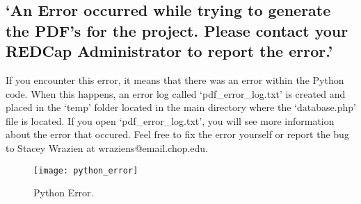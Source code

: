 \documentclass[12pt]{article}
\begin{document}
\subsection{`An Error occurred while trying to generate the PDF's for the project. Please contact your REDCap Administrator to report the error.'}
If you encounter this error, it means that there was an error within the Python code. When this happens, an error log called `pdf\_error\_log.txt' is created and placed in the `temp' folder located in the main directory where the `database.php' file is located. If you open `pdf\_error\_log.txt', you will see more information about the error that occured. Feel free to fix the error yourself or report the bug to Stacey Wrazien at wraziens@email.chop.edu. 
    \begin{figure}[H]
        \centering
        \texttt{[image: python\_error]}
        \caption{Python Error.}
       	\label{fig:Python Error}
   \end{figure}
\end{document}
